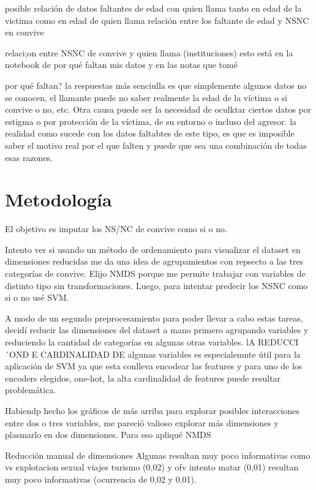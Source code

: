 \documentclass[10 pt]{article}
\begin{document}
posible relación de datos faltantes de edad con quien llama tanto en edad de la victima como en edad de quien llama
relación entre los faltante de edad y NSNC en convive

relaci;on entre NSNC de convive y quien llama (instituciones) esto está en la notebook de por qué faltan mis datos y en las notas que tomé

por qué faltan? la respuestas más senciulla es que simplemente algunos datos no se conocen, el llamante puede no saber realmente la edad de la víctima o si convive o no, etc. Otra causa puede ser la necesidad de oculktar ciertos datos por estigma o por protección de la víctima, de su entorno o incluso del agresor. la realidad como sucede con los datos faltabtes de este tipo, es que es imposible saber el motivo real por el que falten y puede que sea una combinación de todas esas razones.


\section*{Metodología}\label{met}

El objetivo es imputar los NS/NC de convive como si o no. 

Intento ver si usando un método de ordenamiento para visualizar el dataset en dimensiones reducidas me da una
idea de agrupamientos con repsecto a las tres categorías de convive. Elijo NMDS porque me permite trabajar con
variables de distinto tipo sin transformaciones.
 Luego, para intentar predecir los NSNC como si o no usé SVM. 

A modo de un segundo preprocesamiento para poder llevar a cabo estas tareas, decidí reducir las dimensiones del dataset a mano primero agrupando variables y reduciendo la cantidad de categorías en algunas otras variables. lA REDUCCI´OND E CARDINALIDAD DE algunas variables es especialemnte útil para la aplicación de SVM ya que esta conlleva encodear las features y para uno de los encoders elegidos, one-hot, la alta cardinalidad de features puede resultar problemática.


Habiendp hecho los gráficos de más arriba para explorar posibles interacciones entre dos o tres variables, me pareció valioso explorar más dimensiones y plasmarlo en dos dimensiones. Para eso apliqué NMDS

Reducción manual de dimensiones
Algunas resultan muy poco informativas como vs explotacion sexual viajes turismo (0,02) y ofv intento matar (0,01) resultan muy poco informativas (ocurrencia de 0,02 y 0,01). 
\end{document}
